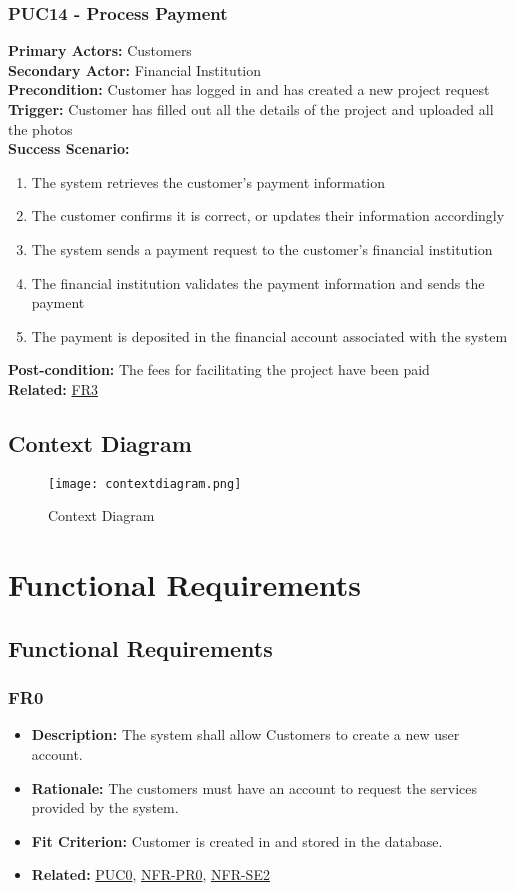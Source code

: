 \documentclass[12pt]{article}
\begin{document}
\subsubsection*{PUC14 - Process Payment}
\label{sec:PUC14}
\textbf{Primary Actors:} Customers\\
\textbf{Secondary Actor:} Financial Institution\\
\textbf{Precondition:} Customer has logged in and has created a new project request\\
\textbf{Trigger:} Customer has filled out all the details of the project and uploaded all the photos\\
\textbf{Success Scenario:}
\begin{enumerate}
    \item The system retrieves the customer's payment information
    \item The customer confirms it is correct, or updates their information accordingly
    \item The system sends a payment request to the customer's financial institution
    \item The financial institution validates the payment information and sends the payment
    \item The payment is deposited in the financial account associated with the system
\end{enumerate}
\textbf{Post-condition:} The fees for facilitating the project have been paid\\
\textbf{Related:} \hyperref[sec:FR3]{FR3}

\subsection*{Context Diagram}
\begin{figure}[H]
  \texttt{[image: contextdiagram.png]}
  \caption{Context Diagram}
      \label{fig:context}
  \end{figure}

\newpage
\section{Functional Requirements}
\subsection{Functional Requirements}
\subsubsection*{FR0}
\label{sec:FR0}
\begin{itemize}
  \item \textbf{Description:} The system shall allow Customers to create a new user account.
  \item \textbf{Rationale:} The customers must have an account to request the services provided by the system.
  \item \textbf{Fit Criterion:} Customer is created in and stored in the database.
  \item \textbf{Related:} \hyperref[sec:PUC0]{PUC0}, \hyperref[sec:PR0]{NFR-PR0}, \hyperref[sec:SE2]{NFR-SE2}
\end{itemize}
\end{document}
